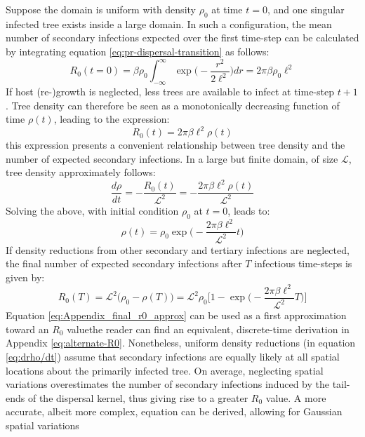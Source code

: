 Suppose the domain is uniform with density $\rho_0$ at time $t=0$, and one singular infected tree exists inside a large domain.
In such a configuration, the mean number of secondary infections expected over the first time-step can be calculated by integrating equation \ref{eq:pr-dispersal-transition} as follows:
\begin{equation}
    R_0(t = 0) = \beta \rho_0 \int^{\infty}_{-\infty} \exp\Big(-\frac{r^2}{2\ell^2}\Big)dr= 2\pi\beta\rho_0\ell^2
\end{equation}
If host (re-)growth is neglected, less trees are available to infect at time-step $t+1$. 
Tree density can therefore be seen as a monotonically decreasing function of time $\rho(t)$, leading to the expression:
\begin{equation}
    R_0(t) = 2\pi\beta\ell^2\rho(t)
    \label{eq:r0-A}
\end{equation}
this expression presents a convenient relationship between tree density and the number of expected secondary infections. 
In a large but finite domain, of size $\mathcal{L}$, tree density approximately follows:
\begin{equation}
\label{eq:drho/dt}
    \frac{d\rho}{dt} = - \frac{R_0(t)}{\mathcal{L}^2} = -\frac{2\pi\beta\ell^2\rho(t)}{\mathcal{L}^2}
\end{equation}
Solving the above, with initial condition $\rho_0$ at $t=0$, leads to:
\begin{equation}
\label{eq:rho(t)-linear}
    \rho(t) = \rho_0 \exp\Big(-\frac{2\pi\beta\ell^2}{\mathcal{L}^2} t \Big)
\end{equation}
If density reductions from other secondary and tertiary infections are neglected, the final number of expected secondary infections after $T$ infectious time-steps is given by:
\begin{equation}
\label{eq:Appendix_final_r0_approx}
    R_0(T) =  \mathcal{L}^2\big(\rho_0 - \rho(T)\big) = \mathcal{L}^2\rho_0\Big[1 - \exp\big(-\frac{2\pi\beta\ell^2}{\mathcal{L}^2} T \big) \Big]
\end{equation}
Equation \ref{eq:Appendix_final_r0_approx} can be used as a first approximation toward an $R_0$ value\textemdash the reader can find an equivalent, discrete-time derivation in Appendix \ref{eq:alternate-R0}.
Nonetheless, uniform density reductions (in equation \ref{eq:drho/dt}) assume that secondary infections are equally likely at all spatial locations about the primarily infected tree. 
On average, neglecting spatial variations overestimates the number of secondary infections induced by the tail-ends of the dispersal kernel,
thus giving rise to a greater $R_0$ value.
A more accurate, albeit more complex, equation can be derived, allowing for Gaussian spatial variations


